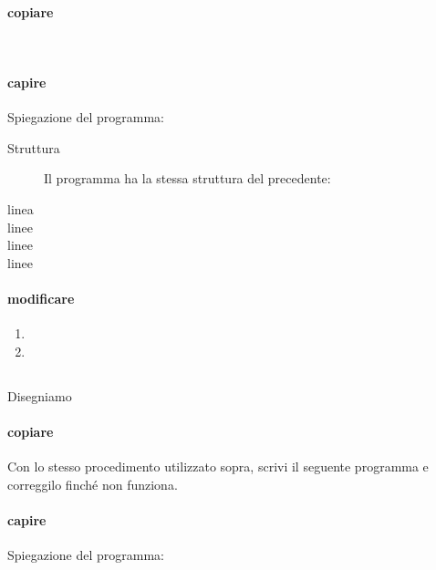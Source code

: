 \paragraph{copiare}
{~}



\paragraph{capire}
Spiegazione del programma:

\begin{description}
 \item [Struttura] 
 Il programma ha la stessa struttura del precedente:
 \item [linea ]
 
 \item [linee ]
 
 \item [linee ]
 \item [linee ]
\end{description}

\begin{osservazione}

\end{osservazione}

\paragraph{modificare}
\begin{enumerate} [noitemsep]
 \item 
 \item 
\end{enumerate}


\subsection{}
\label{subsec:geo_int_}
Disegniamo 

\paragraph{copiare}
Con lo stesso procedimento utilizzato sopra, scrivi il seguente programma e 
correggilo finché non funziona.



\paragraph{capire}
Spiegazione del programma:

